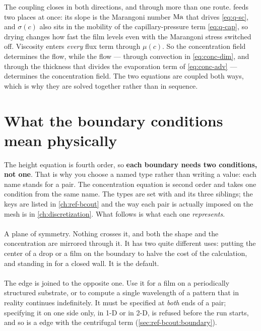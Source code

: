 The coupling closes in both directions, and through more than one route.
 feeds two places at once: its slope  is the
Marangoni number $\mathrm{Ma}$ that drives \cref{eq:q-sc}, and $\sigma(c)$ also sits in
the mobility of the capillary-pressure term \cref{eq:q-cap}, so drying changes
how fast the film levels even with the Marangoni stress switched off. Viscosity
enters \emph{every} flux term through $\mu(c)$. So the concentration field
determines the flow, while the flow --- through convection in
\cref{eq:conc-dim}, and through the thickness that divides the evaporation term
of \cref{eq:conc-adv}
--- determines the concentration field. The two equations are coupled both
ways, which is why they are solved together rather than in sequence.

\section{What the boundary conditions mean physically}
\label{sec:conc:boundaries}

The height equation is fourth order, so \textbf{each boundary needs two
conditions, not one}. That is why you choose a named type rather than writing a
value: each name stands for a pair. The concentration equation is second order
and takes one condition from the same name. The types are set with
 and its three siblings; the keys are listed in
\cref{ch:ref-bcout} and the way each pair is actually imposed on the mesh is in
\cref{ch:discretization}. What follows is what each one \emph{represents}.

\paragraph{} A plane of symmetry. Nothing crosses it, and both
the shape and the concentration are mirrored through it. It has two quite
different uses: putting the center of a drop or a film on the boundary to halve
the cost of the calculation, and standing in for a closed wall. It is the
default.

\paragraph{} The edge is joined to the opposite one. Use it for
a film on a periodically structured substrate, or to compute a single
wavelength of a pattern that in reality continues indefinitely. It must be
specified at \emph{both} ends of a pair; specifying it on one side only, in
1-D or in 2-D, is refused before the run starts, and so is a 
edge with the centrifugal term (\cref{sec:ref-bcout:boundary}).

